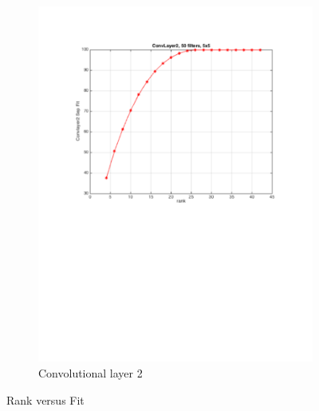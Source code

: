 \documentclass{article} %
\begin{document}
\begin{figure}[h]
\begin{subfigure}[b]{0.40\textwidth}
    \includegraphics[width=\textwidth]{images/imagesCNN_page2.pdf}
    \caption{Convolutional layer 2}
  \end{subfigure}
  \caption{Rank versus Fit}
  \label{fig:cnn1fitness}
\end{figure}
\end{document}
